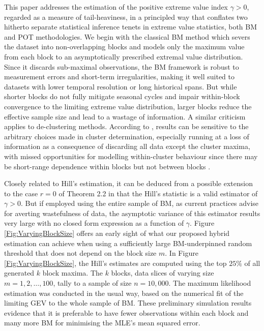 \documentclass[11pt, a4paper, oneside]{article}
\numberwithin{equation}{section}
\theoremstyle{plain}
\theoremstyle{definition}
\begin{document}
This paper addresses the estimation of the positive extreme value index $\gamma >0$, regarded as a measure of tail-heaviness, in a principled way that conflates two hitherto separate statistical inference tenets in extreme value statistics, both BM and POT methodologies. We begin with the classical BM method which severs the dataset into non-overlapping blocks and models only the maximum value from each block to an asymptotically prescribed extremal value distribution. Since it discards sub-maximal observations, the BM framework is robust to measurement errors and short-term irregularities, making it well suited to datasets with lower temporal resolution or long historical spans. But while shorter blocks do not fully mitigate seasonal cycles and impair within-block convergence to the limiting extreme value  distribution, larger blocks reduce the effective sample size and lead to a wastage of information. A similar criticism applies to de-clustering methods. According to \citet[][pp.100,178]{Coles2001}, results can be sensitive to the arbitrary choices made in cluster determination, especially running at a loss of information as a consequence of discarding all data except the cluster maxima, with missed opportunities for modelling within-cluster behaviour since there may be short-range dependence within blocks but not between blocks \citep{Katz2002}.

Closely related to Hill's estimation, it can be deduced from a possible extension to the case $r=0$ of Theorem 2.2 in \citet[][albeit for $\gamma < 1/2$, as $m\rightarrow \infty$]{FerreiradeHaan2015} that the Hill's statistic is a valid estimator of $\gamma >0$. But if employed using the entire sample of BM, as current practices advise for averting wastefulness of data, the asymptotic variance of this estimator results very large with no closed form expression as a function of $\gamma$. Figure \ref{Fig:VaryingBlockSize} offers an early sight of what our proposed hybrid estimation can achieve when using a sufficiently large BM-underpinned random threshold that does not depend on the block size $m$. In Figure \ref{Fig:VaryingBlockSize}, the Hill's estimates are computed using the top $25\%$ of all generated $k$ block maxima. The $k$ blocks, data slices of varying size $m= 1, 2, \ldots, 100$, tally to a sample of size $n=10,000$. The maximum likelihood estimation was conducted in the usual way, based on the numerical fit of the limiting GEV to the whole sample of BM. These preliminary simulation results evidence that it is preferable to have fewer observations within each block and many more BM for minimising the MLE's mean squared error.
\end{document}
